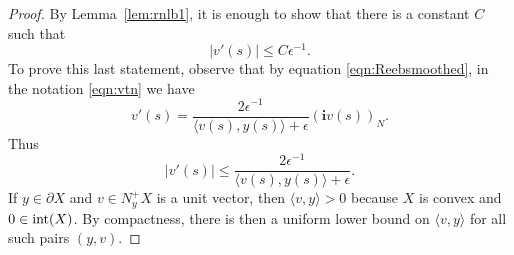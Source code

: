 \begin{proof}
By Lemma~\ref{lem:rnlb1}, it is enough to show that there is a constant $C$ such that
\[
|v'(s)|\le C\epsilon^{-1}.
\]
To prove this last statement, observe that by equation \eqref{eqn:Reebsmoothed}, in the notation \eqref{eqn:vtn} we have
\[
v'(s) = \frac{2\epsilon^{-1}}{\langle v(s),y(s)\rangle + \epsilon}({\mathbf i}v(s))_N.
\]
Thus
\[
|v'(s)|
\le \frac{2\epsilon^{-1}}{\langle v(s),y(s)\rangle + \epsilon}.
\]
If $y\in\partial X$ and $v\in N_y^+X$ is a unit vector, then $\langle v,y\rangle >0$ because $X$ is convex and $0\in\operatorname{int}(X)$. By compactness, there is then a uniform lower bound on $\langle v,y\rangle$ for all such pairs $(y,v)$.
\end{proof}
























